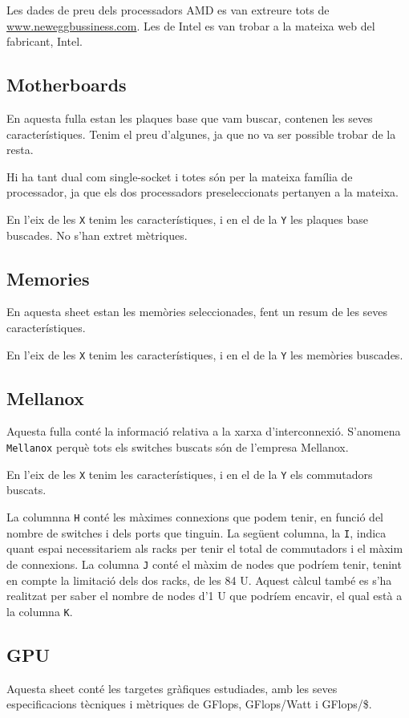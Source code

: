 Les dades de preu dels processadors AMD es van extreure tots de \url{www.neweggbussiness.com}. Les de Intel es van trobar a la mateixa web del fabricant, Intel.

\subsection{Motherboards}
En aquesta fulla estan les plaques base que vam buscar, contenen les seves característiques. Tenim el preu d'algunes, ja que no va ser possible trobar de la resta.

Hi ha tant dual com single-socket i totes són per la mateixa família de processador, ja que els dos processadors preseleccionats pertanyen a la mateixa.

En l'eix de les \texttt{X} tenim les característiques, i en el de la \texttt{Y} les plaques base buscades.
No s'han extret mètriques.

\subsection{Memories}
En aquesta sheet estan les memòries seleccionades, fent un resum de les seves característiques.

En l'eix de les \texttt{X} tenim les característiques, i en el de la \texttt{Y} les memòries buscades.

\subsection{Mellanox}
Aquesta fulla conté la informació relativa a la xarxa d'interconnexió. S'anomena \texttt{Mellanox} perquè tots els switches buscats són de l'empresa Mellanox.

En l'eix de les \texttt{X} tenim les característiques, i en el de la \texttt{Y} els commutadors buscats.

La columnna \texttt{H} conté les màximes connexions que podem tenir, en funció del nombre de switches i dels ports que tinguin. 
La següent columna, la \texttt{I}, indica quant espai necessitariem als racks per tenir el total de commutadors i el màxim de connexions.
La columna \texttt{J} conté el màxim de nodes que podríem tenir, tenint en compte la limitació dels dos racks, de les 84 U. 
Aquest càlcul també es s'ha realitzat per saber el nombre de nodes d'1 U que podríem encavir, el qual està a la columna \texttt{K}.

\subsection{GPU}
Aquesta sheet conté les targetes gràfiques estudiades, amb les seves especificacions tècniques i mètriques de GFlops, GFlops/Watt i GFlops/\$.

